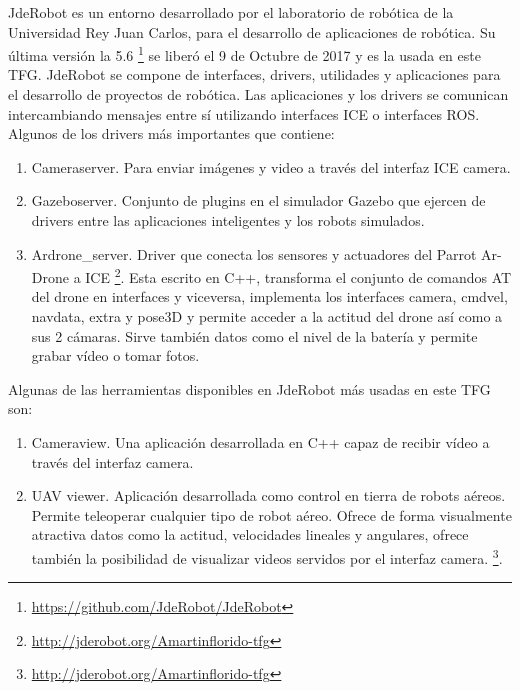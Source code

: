 JdeRobot\cite{jderobot} es un entorno desarrollado por el laboratorio de robótica de la Universidad Rey Juan Carlos, para el desarrollo de aplicaciones de robótica. Su última versión la 5.6 \footnote{\url{https://github.com/JdeRobot/JdeRobot}} se liberó el 9 de Octubre de 2017 y es la usada en este TFG. JdeRobot se compone de interfaces, drivers, utilidades y aplicaciones para el desarrollo de proyectos de robótica. Las aplicaciones y los drivers se comunican intercambiando mensajes entre sí utilizando interfaces ICE o interfaces ROS.
Algunos de los drivers más importantes que contiene:
\begin{enumerate}
\item Cameraserver. Para enviar imágenes y video a través del interfaz ICE camera.
\item Gazeboserver. Conjunto de plugins en el simulador Gazebo que ejercen de drivers entre las aplicaciones inteligentes y los robots simulados.
\item Ardrone\_server. Driver que conecta los sensores y actuadores del Parrot Ar-Drone a ICE \footnote{\url{http://jderobot.org/Amartinflorido-tfg}}. Esta escrito en C++, transforma el conjunto de comandos AT del drone en interfaces y viceversa, implementa los interfaces camera, cmdvel, navdata, extra y pose3D y permite acceder a la actitud del drone así como a sus 2 cámaras. Sirve también datos como el nivel de la batería y permite grabar vídeo o tomar fotos.
\end{enumerate}
Algunas de las herramientas disponibles en JdeRobot más usadas en este TFG son:
\begin{enumerate}
\item Cameraview. Una aplicación desarrollada en C++ capaz de recibir vídeo a través del interfaz camera.
\item UAV viewer. Aplicación desarrollada como control en tierra de robots aéreos. Permite teleoperar cualquier tipo de robot aéreo. Ofrece de forma visualmente atractiva datos como la actitud, velocidades lineales y angulares, ofrece también la posibilidad de visualizar videos servidos por el interfaz camera. \footnote{\url{http://jderobot.org/Amartinflorido-tfg}}.
\end{enumerate}

